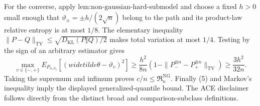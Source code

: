 For the converse, apply \(\text{lem:non-gaussian-hard-submodel}\) and choose a fixed \(h>0\) small enough that \(\vartheta_{\pm}=\pm h/(2\sqrt n)\) belong to the path and its product-law relative entropy is at most \(1/8\).  The elementary inequality \(\|P-Q\|_{\mathrm{TV}}\le\sqrt{D_{\mathrm{KL}}(P\Vert Q)/2}\) makes total variation at most \(1/4\).  Testing by the sign of an arbitrary estimator gives
\[
 \max_{v\in\{-,+\}}E_{P_{n,\vartheta_v}}
 [(widetilde\theta-\vartheta_v)^2]
 \ge\frac{h^2}{8n}(1-\|P_-^{\otimes n}-P_+^{\otimes n}\|_{\mathrm{TV}})
 \ge\frac{3h^2}{32n}.
\]
Taking the supremum and infimum proves \(c/n\le\mathfrak R_n^{\mathrm{NG}}\).  Finally (5) and Markov's inequality imply the displayed generalized-quantile bound.  The ACE disclaimer follows directly from the distinct broad and comparison-subclass definitions.